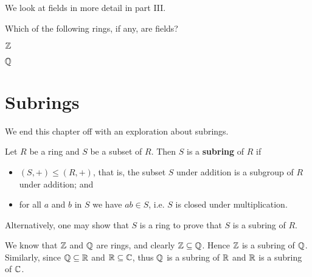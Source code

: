 We look at fields in more detail in part III.

\begin{exercise}
    Which of the following rings, if any, are fields?
    \begin{partquestions}{\alph*}
        \item $\mathbb{Z}$
        \item $\mathbb{Q}$
    \end{partquestions}
\end{exercise}

\section{Subrings}
We end this chapter off with an exploration about subrings.

\begin{definition}
    Let $R$ be a ring and $S$ be a subset of $R$. Then $S$ is a \textbf{subring} of $R$ if
    \begin{itemize}
        \item $(S, +) \leq (R, +)$, that is, the subset $S$ under addition is a subgroup of $R$ under addition; and
        \item for all $a$ and $b$ in $S$ we have $ab \in S$, i.e. $S$ is closed under multiplication.
    \end{itemize}
\end{definition}
\begin{remark}
    Alternatively, one may show that $S$ is a ring to prove that $S$ is a subring of $R$.
\end{remark}

\begin{example}
    We know that $\mathbb{Z}$ and $\mathbb{Q}$ are rings, and clearly $\mathbb{Z} \subseteq \mathbb{Q}$. Hence $\mathbb{Z}$ is a subring of $\mathbb{Q}$. Similarly, since $\mathbb{Q} \subseteq \mathbb{R}$ and $\mathbb{R} \subseteq \mathbb{C}$, thus $\mathbb{Q}$ is a subring of $\mathbb{R}$ and $\mathbb{R}$ is a subring of $\mathbb{C}$.
\end{example}

